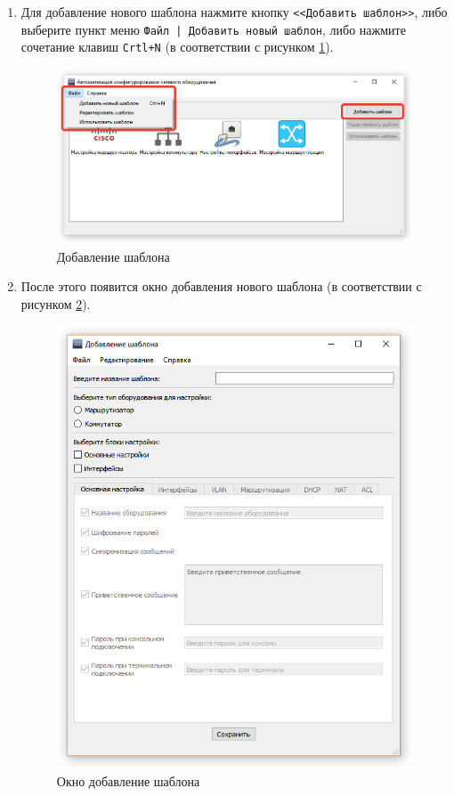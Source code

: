 \label{section:add_template}
\begin{enumerate}
	\item 
Для добавление нового шаблона нажмите кнопку \texttt{<<Добавить шаблон>>}, либо выберите пункт меню \texttt{Файл | Добавить новый шаблон}, либо нажмите сочетание клавиш \texttt{Crtl+N} (в соответствии с рисунком \ref{fig:add_template}).

\begin{figure}[h!]
	\centering
	\includegraphics[width=0.8\linewidth]{pic/add_template}
	\caption{Добавление шаблона}
	\label{fig:add_template}
\end{figure}

	\item После этого появится окно добавления нового шаблона (в соответствии с рисунком \ref{fig:template_window}).

\begin{figure}[ht!]
\centering
\includegraphics[width=1\linewidth]{pic/template_window}
\caption{Окно добавление шаблона}
\label{fig:template_window}
\end{figure}


\end{enumerate}
